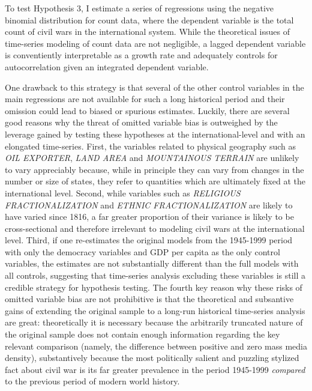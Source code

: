 \documentclass[11pt,article,oneside]{memoir}
\begin{document}
To test Hypothesis 3, I estimate a series of regressions using the
negative binomial distribution for count data, where the dependent
variable is the total count of civil wars in the international system.
While the theoretical issues of time-series modeling of count data are
not negligible, a lagged dependent variable is conventiently
interpretable as a growth rate and adequately controls for
autocorrelation given an integrated dependent variable.

One drawback to this strategy is that several of the other control
variables in the main regressions are not available for such a long
historical period and their omission could lead to biased or spurious
estimates. Luckily, there are several good reasons why the threat of
omitted variable bias is outweighed by the leverage gained by testing
these hypotheses at the international-level and with an elongated
time-series. First, the variables related to physical geography such as
\emph{OIL EXPORTER}, \emph{LAND AREA} and \emph{MOUNTAINOUS TERRAIN} are
unlikely to vary appreciably because, while in principle they can vary
from changes in the number or size of states, they refer to quantities
which are ultimately fixed at the international level. Second, while
variables such as \emph{RELIGIOUS FRACTIONALIZATION} and \emph{ETHNIC
FRACTIONALIZATION} are likely to have varied since 1816, a far greater
proportion of their variance is likely to be cross-sectional and
therefore irrelevant to modeling civil wars at the international level.
Third, if one re-estimates the original models from the 1945-1999 period
with only the democracy variables and GDP per capita as the only control
variables, the estimates are not substantially different than the full
models with all controls, suggesting that time-series analysis excluding
these variables is still a credible strategy for hypothesis testing. The
fourth key reason why these risks of omitted variable bias are not
prohibitive is that the theoretical and subsantive gains of extending
the original sample to a long-run historical time-series analysis are
great: theoretically it is necessary because the arbitrarily truncated
nature of the original sample does not contain enough information
regarding the key relevant comparison (namely, the difference between
positive and zero mass media density), substantively because the most
politically salient and puzzling stylized fact about civil war is its
far greater prevalence in the period 1945-1999 \emph{compared} to the
previous period of modern world history.
\end{document}
